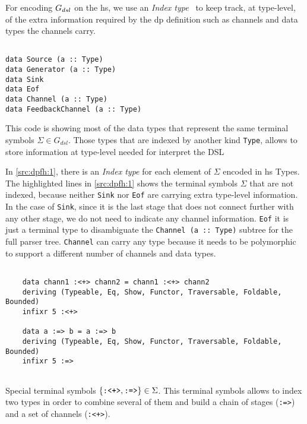 For encoding $G_{dsl}$ on the \acrshort{hs}, we use an \emph{Index type}~\cite{type-index} to keep track, at type-level, of the extra information required by the \acrshort{dp} definition such as channels and data types the channels carry. 

\begin{listing}[H]
  \begin{verbatim}

data Source (a :: Type)
data Generator (a :: Type)
data Sink
data Eof
data Channel (a :: Type)
data FeedbackChannel (a :: Type)

  \end{verbatim}
  \caption[{[\texttt{Flow.hs}] $\Sigma$ enconding of $G_{dsl}$}]{This code is showing most of the data types that represent the same terminal symbols $\Sigma \in G_{dsl}$. Those types that are indexed by another kind \texttt{Type}, allows to store information at type-level needed for interpret the DSL}
  \label{src:dpfh:1}
\end{listing}
  
In \autoref{src:dpfh:1}, there is an \emph{Index type} for each element of $\Sigma$ encoded in \acrshort{hs} Types.
The highlighted lines in \autoref{src:dpfh:1} shows the terminal symbols $\Sigma$ that are not indexed, because neither \texttt{Sink} nor \texttt{Eof} are carrying extra type-level information. 
In the case of \texttt{Sink}, since it is the last stage that does not connect further with any other stage, we do not need to indicate any channel information. 
\texttt{Eof} it is just a terminal type to disambiguate the \texttt{Channel (a :: Type)} subtree for the full parser tree. 
\texttt{Channel} can carry any type because it needs to be polymorphic to support a different number of channels and data types.

\begin{listing}[H]
  \begin{verbatim}
    
    data chann1 :<+> chann2 = chann1 :<+> chann2
    deriving (Typeable, Eq, Show, Functor, Traversable, Foldable, Bounded)
    infixr 5 :<+>
    
    data a :=> b = a :=> b
    deriving (Typeable, Eq, Show, Functor, Traversable, Foldable, Bounded)
    infixr 5 :=>
    
  \end{verbatim}
  \caption[{[\texttt{Flow.hs}] $\Sigma$ enconding of $G_{dsl}$ - Especial non-terminals}]{Special terminal symbols $\{\text{\texttt{:<+>}}, \text{\texttt{:=>}}\} \in \Sigma$. This terminal symbols allows to index two types in order to combine several of them and build a chain of stages (\texttt{:=>}) and a set of channels (\texttt{:<+>}).}
  \label{src:dpfh:2}
\end{listing}

